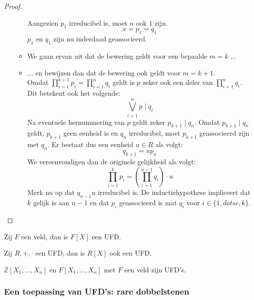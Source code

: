 \documentclass[main.tex]{subfiles}
\begin{document}
\begin{st}
\begin{proof}
\begin{itemize}
\begin{itemize}
        Aangezien $p_{1}$ irreducibel is, moet $n$ ook $1$ zijn.
        \[ x = p_{1} = q_{1} \]
        $p_{1}$ en $q_{1}$ zijn nu inderdaad geassocieerd.
      \item We gaan ervan uit dat de bewering geldt voor een bepaalde $m=k$ ...
      \item ... en bewijzen dan dat de bewering ook geldt voor $m=k+1$.\\
        Omdat $ \prod_{i=1}^{k+1}p_{i} = \prod_{i=1}^{n}q_{i}$ geldt is $p$ zeker ook een deler van $\prod_{i=1}^{n}q_{i}$.
        Dit betekent ook het volgende:
        \[ \bigvee_{i=1}^{n}p \mid q_{i}\]
        Na eventuele hernummering van $p$ geldt zeker $p_{k+1} \mid q_{n}$.
        Omdat $p_{k+1} \mid q_{n}$ geldt, $p_{k+1}$ geen eenheid is en $q_{n}$ irreducibel, moet $p_{k+1}$ geassocieerd zijn met $q_{n}$.
        Er bestaat dus een eenheid $u\in R$ als volgt:
        \[ q_{k+1} = up_{n}\]
        We vereenvoudigen dan de originele gelijkheid als volgt:
        \[ \prod_{i=1}^{k}p_{i} = \left(\prod_{i=1}^{n-1}q_{i}\right) \cdot u\]
        Merk nu op dat $q_{n-1}u$ irreducibel is.\waarom
        De inductiehypothese impliceert dat $k$ gelijk is aan $n-1$ en dat $p_{i}$ geassocieerd is mat $q_{i}$ voor $i \in \{ 1,dotsc,k\}$.
      \end{itemize}
    \end{itemize}
  \end{proof}
\end{st}

\begin{gev}
  Zij $F$ een veld, dan is $F[X]$ een UFD.
\end{gev}

\begin{st}
  Zij $R,+,\cdot$ een UFD, dan is $R[X]$ ook een UFD.
  \zb
\end{st}

\begin{gev}
  $\mathbb{Z}[X_{1},\dotsc,X_{n}]$ en $F[X_{1},\dotsc,X_{n}]$ met $F$ een veld zijn UFD's.
\end{gev}

\subsubsection{Een toepassing van UFD's: rare dobbelstenen}
\label{sec:een-toepassing-van-ufds}

\end{document}
